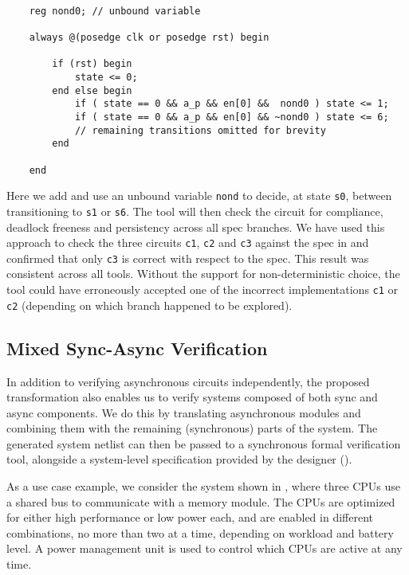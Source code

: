 \vspace{0.2cm}

\begin{tcolorbox}[frame hidden,interior hidden,boxsep=0pt,boxrule=1pt]
	\footnotesize
	\begin{verbatim}

	reg nond0; // unbound variable

	always @(posedge clk or posedge rst) begin

	    if (rst) begin
	        state <= 0;
	    end else begin
	        if ( state == 0 && a_p && en[0] &&  nond0 ) state <= 1;
	        if ( state == 0 && a_p && en[0] && ~nond0 ) state <= 6;
	        // remaining transitions omitted for brevity
	    end

	end
	\end{verbatim}
\end{tcolorbox}

Here we add and use an unbound variable \texttt{nond} to decide, at state
\texttt{s0}, between transitioning to \texttt{s1} or \texttt{s6}. The tool
will then check the circuit for compliance, deadlock freeness and persistency
across all spec branches. We have used this approach to check the three
circuits \texttt{c1}, \texttt{c2} and \texttt{c3} against the spec in
 and confirmed that only \texttt{c3} is correct with respect
to the spec. This result was consistent across all tools. Without the support
for non-deterministic choice, the tool could have erroneously accepted one of
the incorrect implementations \texttt{c1} or \texttt{c2} (depending on which
branch happened to be explored).

\vspace{0.2cm}

\subsection{Mixed Sync-Async Verification}
\label{subsec:mixed}

In addition to verifying asynchronous circuits independently, the proposed
transformation also enables us to verify systems composed of both sync and
async components. We do this by translating asynchronous modules and combining
them with the remaining (synchronous) parts of the system. The generated
system netlist can then be passed to a synchronous formal verification tool,
alongside a system-level specification provided by the designer
().

As a use case example, we consider the system shown in ,
where three CPUs use a shared bus to communicate with a memory module. The
CPUs are optimized for either high performance or low power each, and are
enabled in different combinations, no more than two at a time, depending on
workload and battery level. A power management unit is used to control which
CPUs are active at any time.

